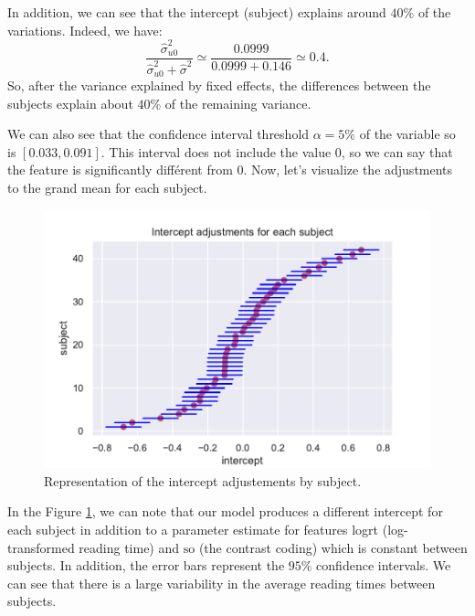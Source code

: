 \documentclass{article}
\begin{document}
In addition, we can see that the intercept (subject) explains around $40\%$ of the variations. Indeed, we have: $$\dfrac{\hat{\sigma}_{u0}^2}{\hat{\sigma}_{u0}^2+\hat{\sigma}^2} \simeq \dfrac{0.0999}{0.0999+0.146} \simeq 0.4.$$
So, after the variance explained by fixed effects, the differences between the subjects explain about $40\%$ of the remaining variance.

We can also see that the confidence interval 
threshold $\alpha=5\%$ of the variable so is $[0.033, 0.091]$. This interval does not include the value $0$, so we can say that the feature  is significantly différent from $0$.
Now, let's visualize the adjustments to the grand mean for each subject.

\begin{figure}[H]
    \centering
    \includegraphics[scale=.65]{./images/model1_inter.pdf}
    \caption{Representation of the intercept adjustements by subject.}
    \label{fig:model1}
\end{figure}

In the Figure \ref{fig:model1}, we can note that our model produces a different intercept for each subject in addition to a parameter estimate for features logrt (log-transformed reading time) and $\text{so}$ (the contrast coding) which is constant between subjects. In addition, the error bars represent the $95\%$ confidence intervals. We can see that there is a large variability in the average reading times between subjects.
\end{document}
